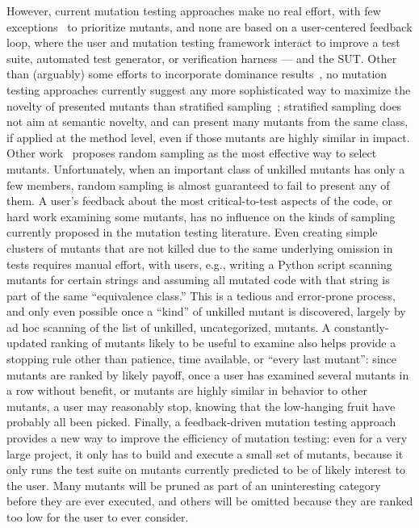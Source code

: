 However, current mutation testing approaches make
no real effort, with few exceptions~\cite{MutGoogle,FaRM} to prioritize mutants,
and none are based on a user-centered feedback loop, where the user and mutation
testing framework interact to improve a test suite, automated test generator, or
verification harness --- and the SUT.  Other than (arguably) some efforts to
incorporate dominance results~\cite{MutQuality}, no mutation testing approaches
currently suggest any more sophisticated way to maximize the novelty of
presented mutants than stratified sampling~\cite{gopinath2017mutation};
stratified sampling does not aim at semantic novelty, and can present many
mutants from the same class, if applied at the method level, even if those
mutants are highly similar in impact.  Other work~\cite{gopinath2015howhard}
proposes random sampling as the most effective way to select mutants.
Unfortunately, when an important class of unkilled mutants has only a few
members, random sampling is almost guaranteed to fail to present any of them.  A
user's feedback about the most critical-to-test aspects of the code, or hard
work examining some mutants, has no influence on the kinds of sampling currently
proposed in the mutation testing literature.  Even creating simple clusters of
mutants that are not killed due to the same underlying omission in tests
requires manual effort, with users, e.g., writing a Python script scanning
mutants for certain strings and assuming all mutated code with that string is
part of the same ``equivalence class.''  This is a tedious and error-prone
process, and only even possible once a ``kind'' of unkilled mutant is
discovered, largely by ad hoc scanning of the list of unkilled, uncategorized,
mutants.  A constantly-updated ranking of mutants likely to be useful to examine
also helps provide a stopping rule other than patience, time available, or
``every last mutant'':  since mutants are ranked by likely payoff, once a user
has examined several mutants in a row without benefit, or mutants are highly
similar in behavior to other mutants, a user may reasonably stop, knowing that
the low-hanging fruit have probably all been picked.  Finally, a feedback-driven
mutation testing approach provides a new way to improve the efficiency of
mutation testing:  even for a very large project, it only has to build and
execute a small set of mutants, because it only runs the test suite on mutants
currently predicted to be of likely interest to the user.  Many mutants will be
pruned as part of an uninteresting category before they are ever executed, and
others will be omitted because they are ranked too low for the user to ever
consider. 

